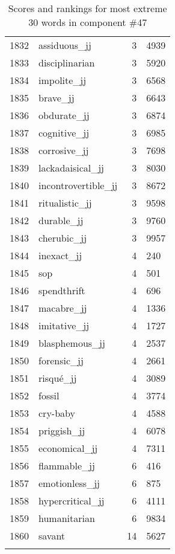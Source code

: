 \begin{longtable}[!htbp]{| rlr@{.}l |}
    1832 & assiduous\_jj & 3 & 4939 \\
    1833 & disciplinarian & 3 & 5920 \\
    1834 & impolite\_jj & 3 & 6568 \\
    1835 & brave\_jj & 3 & 6643 \\
    1836 & obdurate\_jj & 3 & 6874 \\
    1837 & cognitive\_jj & 3 & 6985 \\
    1838 & corrosive\_jj & 3 & 7698 \\
    1839 & lackadaisical\_jj & 3 & 8030 \\
    1840 & incontrovertible\_jj & 3 & 8672 \\
    1841 & ritualistic\_jj & 3 & 9598 \\
    1842 & durable\_jj & 3 & 9760 \\
    1843 & cherubic\_jj & 3 & 9957 \\
    1844 & inexact\_jj & 4 & 240 \\
    1845 & sop & 4 & 501 \\
    1846 & spendthrift & 4 & 696 \\
    1847 & macabre\_jj & 4 & 1336 \\
    1848 & imitative\_jj & 4 & 1727 \\
    1849 & blasphemous\_jj & 4 & 2537 \\
    1850 & forensic\_jj & 4 & 2661 \\
    1851 & risqué\_jj & 4 & 3089 \\
    1852 & fossil & 4 & 3774 \\
    1853 & cry-baby & 4 & 4588 \\
    1854 & priggish\_jj & 4 & 6078 \\
    1855 & economical\_jj & 4 & 7311 \\
    1856 & flammable\_jj & 6 & 416 \\
    1857 & emotionless\_jj & 6 & 875 \\
    1858 & hypercritical\_jj & 6 & 4111 \\
    1859 & humanitarian & 6 & 9834 \\
    1860 & savant & 14 & 5627 \\
    \hline
    \caption{Scores and rankings for most extreme 30 words in component \#47} \\
\end{longtable}
